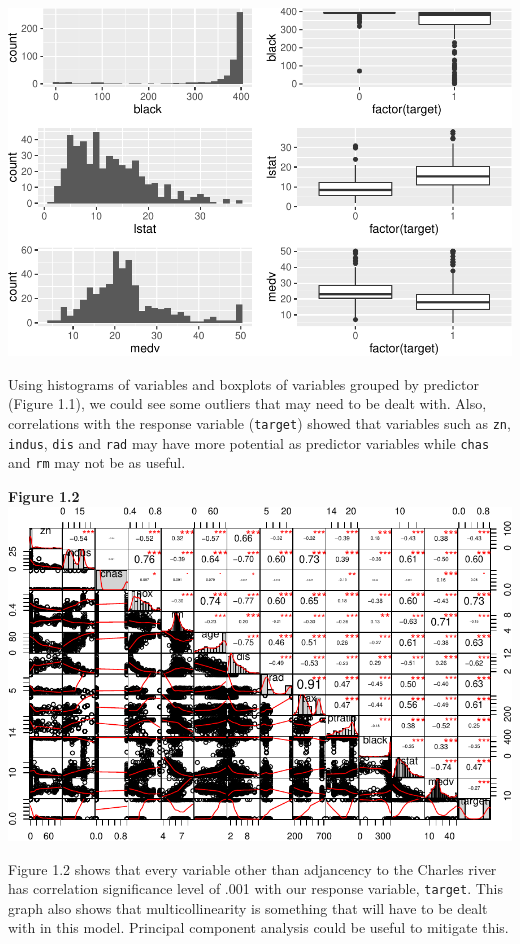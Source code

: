 \documentclass[]{article}
\begin{document}
\includegraphics{HW3_Final_files/figure-latex/unnamed-chunk-2-4.pdf}

Using histograms of variables and boxplots of variables grouped by
predictor (Figure 1.1), we could see some outliers that may need to be
dealt with. Also, correlations with the response variable
(\texttt{target}) showed that variables such as \texttt{zn},
\texttt{indus}, \texttt{dis} and \texttt{rad} may have more potential as
predictor variables while \texttt{chas} and \texttt{rm} may not be as
useful.

\pagebreak  

\textbf{Figure
1.2}\\\includegraphics{HW3_Final_files/figure-latex/unnamed-chunk-4-1.pdf}

Figure 1.2 shows that every variable other than adjancency to the
Charles river has correlation significance level of .001 with our
response variable, \texttt{target}. This graph also shows that
multicollinearity is something that will have to be dealt with in this
model. Principal component analysis could be useful to mitigate this.
\end{document}
